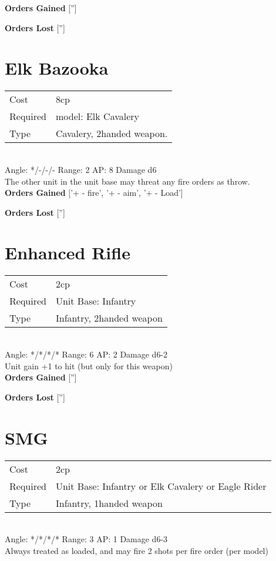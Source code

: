 {\bf Orders Gained}
['']

{\bf Orders Lost}
['']
\section{ Elk Bazooka }

\begin{tabular}{ll}
    Cost & 8cp \\
    Required & model: Elk Cavalery\\
    Type & Cavalery, 2handed weapon.\\
\end{tabular}
\ \\
\indent Angle: */-/-/- Range: 2  AP: 8 Damage d6 \\
The other unit in the unit base may threat any fire orders as throw.
\ \\

{\bf Orders Gained}
['+ - fire', '+ - aim', '+ - Load']

{\bf Orders Lost}
['']
\section{ Enhanced Rifle }

\begin{tabular}{ll}
    Cost & 2cp \\
    Required & Unit Base: Infantry\\
    Type & Infantry, 2handed weapon\\
\end{tabular}
\ \\
\indent Angle: */*/*/* Range: 6  AP: 2 Damage d6-2 \\
Unit gain +1 to hit (but only for this weapon)
\ \\

{\bf Orders Gained}
['']

{\bf Orders Lost}
['']
\section{ SMG }

\begin{tabular}{ll}
    Cost & 2cp \\
    Required & Unit Base: Infantry or Elk Cavalery or Eagle Rider\\
    Type & Infantry, 1handed weapon\\
\end{tabular}
\ \\
\indent Angle: */*/*/* Range: 3  AP: 1 Damage d6-3 \\
Always treated as loaded, and may fire 2 shots per fire order (per model)
\ \\

